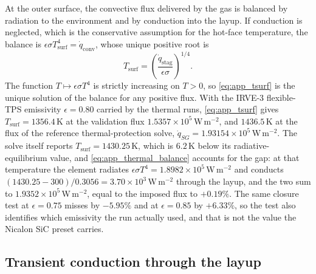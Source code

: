 At the outer surface, the convective flux delivered by the gas is balanced by radiation to the environment and by conduction into the layup. If conduction is neglected, which is the conservative assumption for the hot-face temperature, the balance is $\epsilon\sigma T_{\mathrm{surf}}^4 = \dot{q}_{\mathrm{conv}}$, whose unique positive root is
\begin{equation}
    T_{\mathrm{surf}} = \left(\frac{\dot{q}_{\mathrm{stag}}}{\epsilon\sigma}\right)^{1/4} .
    \label{eq:app_tsurf}
\end{equation}
The function $T\mapsto\epsilon\sigma T^4$ is strictly increasing on $T>0$, so \eqref{eq:app_tsurf} is the unique solution of the balance for any positive flux. With the IRVE-3 flexible-TPS emissivity $\epsilon = 0.80$ carried by the thermal runs, \eqref{eq:app_tsurf} gives $T_{\mathrm{surf}} = 1356.4$\,K at the validation flux $1.5357\times10^5$\,W\,m$^{-2}$, and $1436.5$\,K at the flux of the reference thermal-protection solve, $\dot{q}_{SG} = 1.93154\times10^5$\,W\,m$^{-2}$. The solve itself reports $T_{\mathrm{surf}} = 1430.25$\,K, which is $6.2$\,K below its radiative-equilibrium value, and \eqref{eq:app_thermal_balance} accounts for the gap: at that temperature the element radiates $\epsilon\sigma T^4 = 1.8982\times10^5$\,W\,m$^{-2}$ and conducts $(1430.25-300)/0.3056 = 3.70\times10^3$\,W\,m$^{-2}$ through the layup, and the two sum to $1.9352\times10^5$\,W\,m$^{-2}$, equal to the imposed flux to $+0.19\%$. The same closure test at $\epsilon = 0.75$ misses by $-5.95\%$ and at $\epsilon = 0.85$ by $+6.33\%$, so the test also identifies which emissivity the run actually used, and that is not the value the Nicalon SiC preset carries.

\subsection{Transient conduction through the layup}

